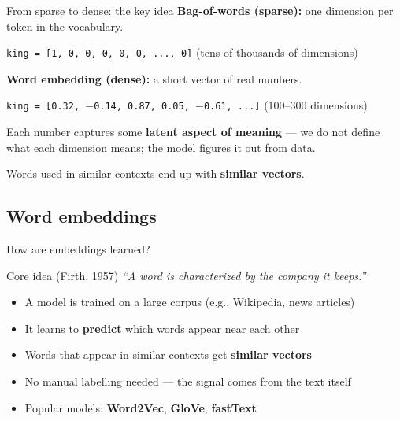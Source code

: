 \documentclass[handout]{beamer}
\begin{document}
\begin{frame}{From sparse to dense: the key idea}
    \textbf{Bag-of-words (sparse):} one dimension per token in the vocabulary.

    \vspace{0.3em}
    \texttt{king = [1, 0, 0, 0, 0, 0, ..., 0]}  \hfill (tens of thousands of dimensions)

    \vspace{0.8em}
    \textbf{Word embedding (dense):} a short vector of real numbers.

    \vspace{0.3em}
    \texttt{king = [0.32, $-$0.14, 0.87, 0.05, $-$0.61, ...]}  \hfill (100--300 dimensions)

    \vspace{0.8em}
    \pause
    Each number captures some \textbf{latent aspect of meaning} --- we do not define what each dimension means; the model figures it out from data.

    \vspace{0.5em}
    \small Words used in similar contexts end up with \textbf{similar vectors}.
\end{frame}

\subsection{Word embeddings}

\begin{frame}{How are embeddings learned?}
    \begin{block}{Core idea (Firth, 1957)}
        \emph{``A word is characterized by the company it keeps.''}
    \end{block}

    \vspace{0.5em}
    \begin{itemize}[<+->]
        \item A model is trained on a large corpus (e.g., Wikipedia, news articles)
        \item It learns to \textbf{predict} which words appear near each other
        \item Words that appear in similar contexts get \textbf{similar vectors}
        \item No manual labelling needed --- the signal comes from the text itself
        \item Popular models: \textbf{Word2Vec}, \textbf{GloVe}, \textbf{fastText}
    \end{itemize}
\end{frame}
\end{document}
